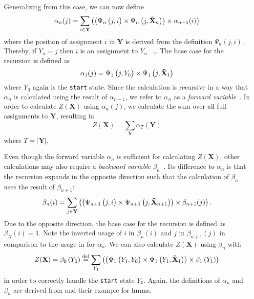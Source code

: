 Generalizing from this case, we can now define
\begin{equation}
  \label{equ:linear-chain-crf-z-alpha}
  \alpha_n(j) = \sum_{i\in\mathbf{Y}}\left(\left(\Psi_n\left(\vphantom{\tilde{X}}j,i\right)\times\Psi_n\left(j,\mathbf{\tilde{X}}_n\right)\right)\times \alpha_{n-1}(i)\right)
\end{equation}
where the position of assignment $i$ in $\mathbf{Y}$ is derived from the definition $\Psi_n(j,i)$.
Thereby, if $Y_n=j$ then $i$ is an assignment to $Y_{n-1}$.
The base case for the recursion is defined as
\begin{equation}
  \label{equ:linear-chain-crf-z-alpha-base}
 \alpha_1(j) = \Psi_1\left(\vphantom{\tilde{X}}j,Y_0\right)\times\Psi_1\left(j,\mathbf{\tilde{X}}_1\right)
\end{equation}
where $Y_0$ again is the \texttt{start} state. Since the calculation is recursive in a way that $\alpha_n$ is calculated using the result of $\alpha_{n-1}$, we refer to $\alpha_n$ as a \textit{forward variable}~\citep{sutton2010introduction}. In order to calculate $Z(\mathbf{X})$ using $\alpha_n(j)$, we calculate the sum over all \glspl{full assignment} to $\mathbf{Y}$, resulting in
\begin{equation}
  \label{equ:linear-chain-crf-z-alpha-sum}
  Z(\mathbf{X})=\sum_{\mathbf{Y}}\alpha_T\left(\mathbf{Y}\right)
\end{equation}
where $T=|\mathbf{Y}|$.
\bigskip

Even though the forward variable $\alpha_n$ is sufficient for calculating $Z(\mathbf{X})$, other calculations may also require a \textit{backward variable} $\beta_n$~\citep{sutton2010introduction}. Its difference to $\alpha_n$ is that the recursion expands in the opposite direction such that the calculation of $\beta_n$ uses the result of $\beta_{n+1}$:
\begin{equation}
  \label{equ:linear-chain-crf-z-beta}
  \beta_n(i) = \sum_{j\in\mathbf{Y}}\left(\left(\Psi_{n+1}\left(\vphantom{\tilde{X}}j,i\right)\times\Psi_{n+1}\left(j,\mathbf{\tilde{X}}_{n+1}\right)\right)\times \beta_{n+1}(j)\right).
\end{equation}
Due to the opposite direction, the base case for the recursion is defined as $\beta_N(i)=1$.
Note the inverted usage of $i$ in $\beta_n(i)$ and $j$ in $\beta_{n+1}(j)$ in comparison to the usage in  for $\alpha_n$.
We can also calculate $Z(\mathbf{X})$ using $\beta_n$ with
\begin{equation}
  \label{equ:linear-chain-crf-z-beta-sum}
  Z(\mathbf{X})=\beta_0\left(Y_0\right)\equalsdef\sum_{Y_1}\left(\left(\Psi_1\left(\vphantom{\tilde{X}}Y_1,Y_0\right)\times\Psi_1\left(Y_1,\mathbf{\tilde{X}}_1\right)\right)\times\beta_1\left(Y_1\right)\right)
\end{equation}
in order to correctly handle the \texttt{start} state $Y_0$.
Again, the definitions of $\alpha_n$ and $\beta_n$ are derived from \citet{sutton2010introduction} and their example for \glspl{hmm}.

